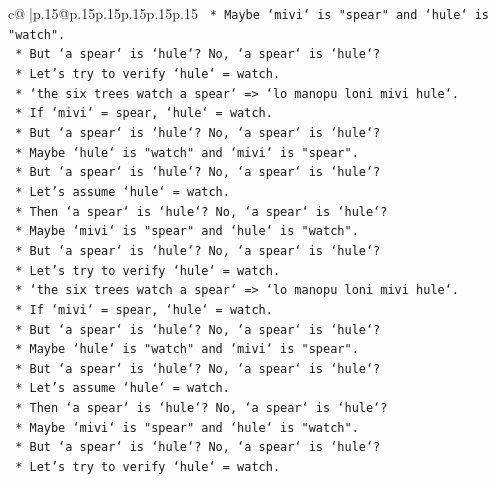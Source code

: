 \documentclass{article}
\begin{document}
{\begin{supertabular}{c@{$\;$}|p{.15\linewidth}@{}p{.15\linewidth}p{.15\linewidth}p{.15\linewidth}p{.15\linewidth}p{.15\linewidth}}
{{{\texttt{                *   Maybe `mivi` is "spear" and `hule` is "watch".} \\
\texttt{                *   But `a spear` is `hule`? No, `a spear` is `hule`?} \\
\texttt{                *   Let's try to verify `hule` = watch.} \\
\texttt{                *   `the six trees watch a spear` => `lo manopu loni mivi hule`.} \\
\texttt{                *   If `mivi` = spear, `hule` = watch.} \\
\texttt{                *   But `a spear` is `hule`? No, `a spear` is `hule`?} \\
\texttt{                *   Maybe `hule` is "watch" and `mivi` is "spear".} \\
\texttt{                *   But `a spear` is `hule`? No, `a spear` is `hule`?} \\
\texttt{                *   Let's assume `hule` = watch.} \\
\texttt{                *   Then `a spear` is `hule`? No, `a spear` is `hule`?} \\
\texttt{                *   Maybe `mivi` is "spear" and `hule` is "watch".} \\
\texttt{                *   But `a spear` is `hule`? No, `a spear` is `hule`?} \\
\texttt{                *   Let's try to verify `hule` = watch.} \\
\texttt{                *   `the six trees watch a spear` => `lo manopu loni mivi hule`.} \\
\texttt{                *   If `mivi` = spear, `hule` = watch.} \\
\texttt{                *   But `a spear` is `hule`? No, `a spear` is `hule`?} \\
\texttt{                *   Maybe `hule` is "watch" and `mivi` is "spear".} \\
\texttt{                *   But `a spear` is `hule`? No, `a spear` is `hule`?} \\
\texttt{                *   Let's assume `hule` = watch.} \\
\texttt{                *   Then `a spear` is `hule`? No, `a spear` is `hule`?} \\
\texttt{                *   Maybe `mivi` is "spear" and `hule` is "watch".} \\
\texttt{                *   But `a spear` is `hule`? No, `a spear` is `hule`?} \\
\texttt{                *   Let's try to verify `hule` = watch.} \\
}}}
\end{supertabular}}
\end{document}
